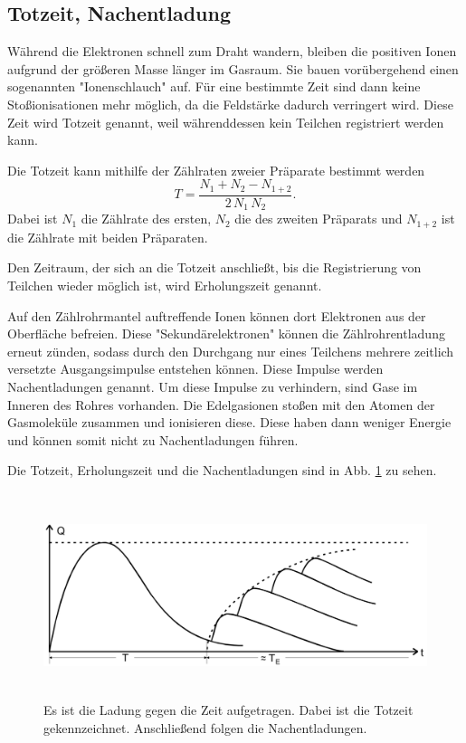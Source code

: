 \subsection{Totzeit, Nachentladung}
Während die Elektronen schnell zum Draht wandern, bleiben die positiven Ionen aufgrund der größeren Masse länger im Gasraum. Sie bauen vorübergehend einen sogenannten "Ionenschlauch" auf. Für eine bestimmte Zeit sind dann keine Stoßionisationen mehr möglich, da die Feldstärke dadurch verringert wird. Diese Zeit wird Totzeit genannt, weil währenddessen kein Teilchen registriert werden kann.

\noindent Die Totzeit kann mithilfe der Zählraten zweier Präparate bestimmt werden
\begin{equation}
    T = \frac{N_1 + N_2 - N_{1+2}}{2 \, N_1 \, N_2}.
    \label{totzeit}
\end{equation}
Dabei ist $N_1$ die Zählrate des ersten, $N_2$ die des zweiten Präparats und $N_{1+2}$ ist die Zählrate mit beiden Präparaten.

\noindent Den Zeitraum, der sich an die Totzeit anschließt, bis die Registrierung von Teilchen wieder möglich ist, wird Erholungszeit genannt.

\noindent Auf den Zählrohrmantel auftreffende Ionen können dort Elektronen aus der Oberfläche befreien. Diese "Sekundärelektronen" können die Zählrohrentladung erneut zünden, sodass durch den Durchgang nur eines Teilchens mehrere zeitlich versetzte Ausgangsimpulse entstehen können. 
Diese Impulse werden Nachentladungen genannt. 
Um diese Impulse zu verhindern, sind Gase im Inneren des Rohres vorhanden. Die Edelgasionen stoßen mit den Atomen der Gasmoleküle zusammen und ionisieren diese. Diese haben dann weniger Energie und können somit nicht zu Nachentladungen führen. 

\noindent Die Totzeit, Erholungszeit und die Nachentladungen sind in Abb. \ref{fig:totzeit} zu sehen.

\begin{figure}
    \centering
    \includegraphics[width=12cm, height=6cm]{build/totzeit.png}
    \caption{Es ist die Ladung gegen die Zeit aufgetragen. Dabei ist die Totzeit gekennzeichnet. Anschließend folgen die Nachentladungen. \cite{V703}}
    \label{fig:totzeit}
\end{figure}


